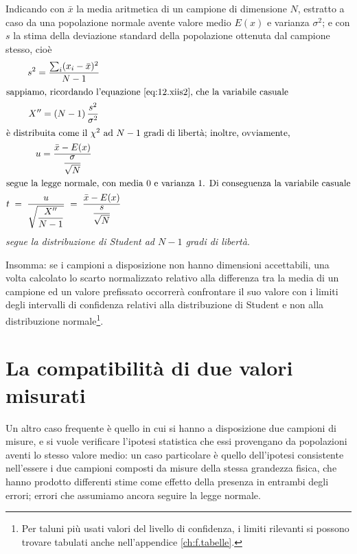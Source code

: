 Indicando con $\bar x$ la media aritmetica di un campione di
dimensione $N$, estratto a caso da una popolazione normale
avente valore medio $E(x)$ e varianza $\sigma^2$; e con $s$
la stima della deviazione standard della popolazione
ottenuta dal campione stesso, cio\`e
\begin{gather}
  s^2 = \frac{\sum_i (x_i - \bar x)^2}{N-1} \notag \\
  \intertext{sappiamo, ricordando l'equazione
    \eqref{eq:12.xiis2}, che la variabile casuale}
  X'' = (N - 1) \, \frac{s^2}{\sigma^2} \notag \\
  \intertext{\`e distribuita come il $\chi^2$ ad
    $N - 1$ gradi di libert\`a; inoltre, ovviamente,}
  u = \frac{\bar x - E(x)}{\dfrac{\sigma}{\sqrt{N}}}
    \notag \\
  \intertext{segue la legge normale, con media 0 e
    varianza 1. Di conseguenza la variabile casuale}
  t \; = \; \frac{u}{\sqrt{\dfrac{X''}{N - 1}}} \; = \;
    \frac{\bar x - E(x)}{\dfrac{s}{\sqrt{N}}}
    \label{eq:12.xsecond}
\end{gather}
\emph{segue la distribuzione di Student ad $N - 1$
  gradi di libert\`a}.

Insomma: se i campioni a disposizione non hanno dimensioni
accettabili, una volta calcolato lo scarto normalizzato
relativo alla differenza tra la media di un campione ed un
valore prefissato occorrer\`a confrontare il suo valore con
i limiti degli intervalli di confidenza relativi alla
distribuzione di Student e non alla distribuzione
normale\/\footnote{Per taluni pi\`u usati valori del livello
  di confidenza, i limiti rilevanti si possono trovare
  tabulati anche nell'appendice \ref{ch:f.tabelle}.}.%
%

\section{La compatibilit\`a di due valori misurati}%
Un altro caso frequente \`e quello in cui si hanno a
disposizione due campioni di misure, e si vuole verificare
l'ipotesi statistica che essi provengano da popolazioni
aventi lo stesso valore medio: un caso particolare \`e
quello dell'ipotesi consistente nell'essere i due campioni
composti da misure della stessa grandezza fisica, che hanno
prodotto differenti stime come effetto della presenza in
entrambi degli errori; errori che assumiamo ancora seguire
la legge normale.

